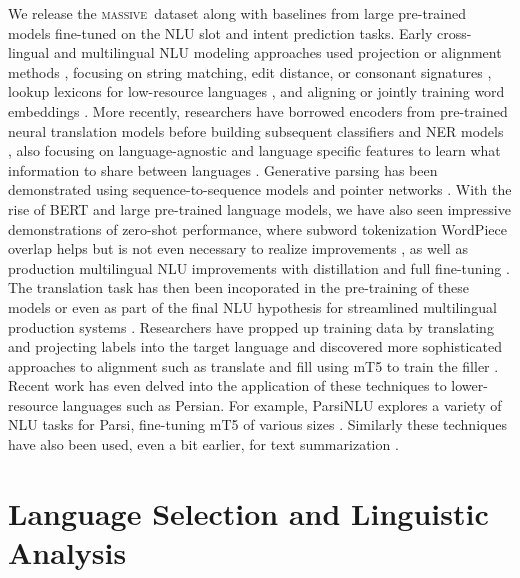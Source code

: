 \documentclass[11pt]{article}
\newcommand{\M}{\textsc{massive}}
\begin{document}
We release the \M~dataset along with baselines from large pre-trained models fine-tuned on the NLU slot and intent prediction tasks.
Early cross-lingual and multilingual NLU modeling approaches used projection or alignment methods \citep{yarowsky-etal-2001-inducing}, focusing on string matching, edit distance, or consonant signatures \citep{ehrmann-etal-2011-building}, lookup lexicons for low-resource languages \citep{mayhew-etal-2017-cheap}, and aligning \citep{xie-etal-2018-neural} or jointly training word embeddings \citep{singla-etal-2018-multi}.
More recently, researchers have borrowed encoders from pre-trained neural translation models before building subsequent classifiers and NER models \citep{eriguchi2018zeroshot, schuster-etal-2019-cross-lingual}, also focusing on language-agnostic and language specific features to learn what information to share between languages \citep{chen-etal-2019-multi-source}.
Generative parsing has been demonstrated using sequence-to-sequence models and pointer networks \citep{dontparsegenerate}.
With the rise of BERT and large pre-trained language models, we have also seen impressive demonstrations of zero-shot performance, where subword tokenization WordPiece overlap helps but is not even necessary to realize improvements \citep{pires-etal-2019-multilingual, k2020crosslingual}, as well as production multilingual NLU improvements with distillation and full fine-tuning \citep{FitzGerald2022AlexaTM}.
The translation task has then been incoporated in the pre-training \citep{wang-etal-2021-exploring-cross} of these models or even as part of the final NLU hypothesis for streamlined multilingual production systems \citep{fitzgerald2020stil}.
Researchers have propped up training data by translating and projecting labels into the target language \citep{xu-etal-2020-end} and discovered more sophisticated approaches to alignment such as translate and fill using mT5 to train the filler \citep{nicosia-etal-2021-translate-fill}.
Recent work has even delved into the application of these techniques to lower-resource languages such as Persian. For example, ParsiNLU explores a variety of NLU tasks for Parsi, fine-tuning mT5 of various sizes \citep{khashabi2021parsinlu}. Similarly these techniques have also been used, even a bit earlier, for text summarization \citep{Farahanipersian2021}.

\section{Language Selection and Linguistic Analysis}
\label{sect:linguistics}
\end{document}
